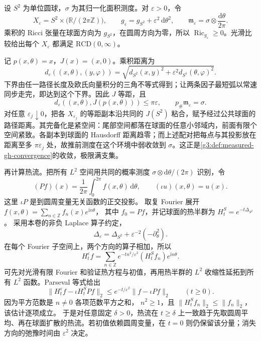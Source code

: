 \begin{example}\label{g3:exm:C-collapsing-product-heat}
	设 \(S^2\) 为单位圆球，\(\sigma\) 为其归一化面积测度。对 \(\varepsilon>0\)，令
	\[
		X_\varepsilon=S^2\times\bigl(\mathbb R/(2\pi\mathbb Z)\bigr),
		\qquad
		g_\varepsilon=g_{S^2}+\varepsilon^2\,\mathrm d\theta^2,
		\qquad
		\mathfrak m_\varepsilon=\sigma\otimes\frac{\mathrm d\theta}{2\pi}.
	\]
	乘积的 Ricci 张量在球面方向为 \(g_{S^2}\)，在圆周方向为零，所以
	\(\operatorname{Ric}_{g_\varepsilon}\ge0\)。光滑比较给出每个
	\(X_\varepsilon\) 都满足 \(\mathrm{RCD}(0,\infty)\)。

	记 \(p(x,\theta)=x\)，\(J(x)=(x,0)\)。乘积距离为
	\[
		d_\varepsilon((x,\theta),(y,\varphi))
		=\sqrt{d_{S^2}(x,y)^2+\varepsilon^2d_{S^1}(\theta,\varphi)^2}.
	\]
	下界由任一路径长度及欧氏向量积分的三角不等式得到；让两条因子最短弧以常速同步走完，即达到这个下界。因此 \(J\) 等距，且
	\[
		d_\varepsilon((x,\theta),J(p(x,\theta)))\le\pi\varepsilon,
		\qquad p_\#\mathfrak m_\varepsilon=\sigma.
	\]
	对任意 \(\varepsilon_j\downarrow0\)，把各 \(X_{\varepsilon_j}\) 的等距副本沿共同的 \(J(S^2)\) 粘合，赋予经过公共球面的路径距离。其完备化是紧空间：尾部空间都落在球面的任意小邻域内，前面有限个空间紧致。各副本到球面的 Hausdorff 距离趋零；而上述配对把每点与其投影放在距离至多 \(\pi\varepsilon_j\) 处，故推前测度在这个环境中弱收敛到 \(\sigma\)。这正是\cref{g3:def:measured-gh-convergence}的收敛，极限满支集。

	再计算热流。把所有 \(L^2\) 空间用共同的概率测度
	\(\sigma\otimes\mathrm d\theta/(2\pi)\) 识别，令
	\[
		(Pf)(x)=\frac1{2\pi}\int_0^{2\pi}f(x,\theta)\,\mathrm d\theta,
		\qquad (\iota u)(x,\theta)=u(x).
	\]
	这里 \(\iota P\) 是到圆周变量无关函数的正交投影。
	取复 Fourier 展开
	\(f(x,\theta)=\sum_{n\in\mathbb Z}f_n(x)e^{\mathrm in\theta}\)，
	其中 \(f_0=Pf\)，并记球面的热半群为 \(H_t^S=e^{-t\Delta_{S^2}}\)。
	采用本卷的非负 Laplace 算子约定，
	\[
		\Delta_\varepsilon=\Delta_{S^2}
		                     +\varepsilon^{-2}(-\partial_\theta^2).
	\]
	在每个 Fourier 子空间上，两个方向的算子相加，所以
	\[
		H_t^\varepsilon f
		=\sum_{n\in\mathbb Z}
		     e^{-tn^2/\varepsilon^2}(H_t^Sf_n)e^{\mathrm in\theta}.
	\]
	可先对光滑有限 Fourier 和验证热方程与初值，再用热半群的
	\(L^2\) 收缩性延拓到所有 \(L^2\) 函数。Parseval 等式给出
	\[
		\|H_t^\varepsilon f-\iota H_t^SPf\|_2
		\le e^{-t/\varepsilon^2}\|f-\iota Pf\|_2
		\qquad(t\ge0).
	\]
	因为平方范数是 \(n\ne0\) 各项范数平方之和，
	\(n^2\ge1\)，且 \(\|H_t^Sf_n\|_2\le\|f_n\|_2\)，该估计逐项成立。
	于是对任意固定 \(\delta>0\)，热流在 \(t\ge\delta\) 上一致趋于先取圆周平均、再在球面扩散的热流。若初值依赖圆周变量，在 \(t=0\) 则仍保留该分量；消失方向的弛豫时间由 \(\varepsilon^2\) 决定。
\end{example}

